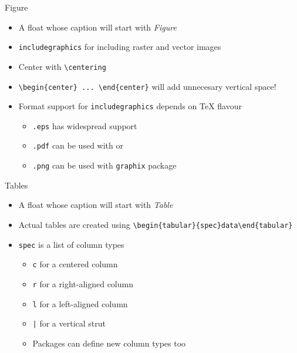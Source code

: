 \documentclass[english]{beamer}
\let\olditem\item
\renewcommand{\item}{\setlength{\itemsep}{\fill}\olditem}
\newenvironment{sitemize}{\let\item\olditem \begin{itemize}}{\vfill\end{itemize}}
\let\textttt\texttt
\renewcommand{\texttt}[1]{\colorbox{gray!10}{\textttt{#1}}}
\begin{document}
\begin{frame}[fragile]{Figure}
    \begin{itemize}
        \item A float whose caption will start with \textit{Figure}
        \item \texttt{includegraphics} for including raster and vector images
        \item Center with \verb|\centering| 
        \item \verb|\begin{center} ... \end{center}| will add unnecesary vertical space!
        \item Format support for \texttt{includegraphics} depends on \TeX{} flavour
        \begin{sitemize}
            \item \texttt{.eps} has widespread support
            \item \texttt{.pdf} can be used with  or 
            \item \texttt{.png} can be used with \texttt{graphix} package
        \end{sitemize}
    \end{itemize}
\end{frame}

\begin{frame}[fragile]{Tables}
    \begin{itemize}
        \item A float whose caption will start with \textit{Table}
        \item Actual tables are created using \verb|\begin{tabular}{spec}data\end{tabular}|
        \item \texttt{spec} is a list of column types
        \begin{sitemize}
            \item[\texttt{c}] for a centered column
            \item[\texttt{r}] for a right-aligned column
            \item[\texttt{l}] for a left-aligned column
            \item[\texttt{|}] for a vertical strut
            \item Packages can define new column types too
        \end{sitemize}
    \end{itemize}
\end{frame}
\end{document}
